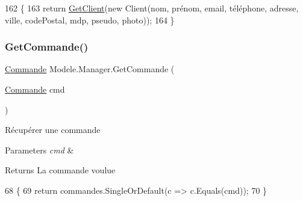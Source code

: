 \begin{DoxyCode}
162         \{
163             \textcolor{keywordflow}{return} \hyperlink{classModele_1_1Manager_a4c99d9b62a7d210103d5590d79781f41}{GetClient}(\textcolor{keyword}{new} Client(nom, prénom, email, téléphone, adresse, ville, codePostal,
       mdp, pseudo, photo));
164         \}
\end{DoxyCode}
\mbox{\label{classModele_1_1Manager_a66c28c0c613264bb1e0b0abc1d0fc97f}} 
\subsubsection{\texorpdfstring{Get\+Commande()}{GetCommande()}\hspace{0.1cm}{\footnotesize\ttfamily [1/2]}}
{\footnotesize\ttfamily \hyperlink{classModele_1_1Commande}{Commande} Modele.\+Manager.\+Get\+Commande (\begin{DoxyParamCaption}\item[{\hyperlink{classModele_1_1Commande}{Commande}}]{cmd }\end{DoxyParamCaption})\hspace{0.3cm}{\ttfamily [inline]}}



Récupérer une commande 


\begin{DoxyParams}{Parameters}
{\em cmd} & \\
\hline
\end{DoxyParams}
\begin{DoxyReturn}{Returns}
La commande voulue
\end{DoxyReturn}

\begin{DoxyCode}
68         \{
69             \textcolor{keywordflow}{return} commandes.SingleOrDefault(c => c.Equals(cmd));
70         \}
\end{DoxyCode}
\mbox{\label{classModele_1_1Manager_aaa9cb4ae995548ff3f12823c4f08e4a8}} 
